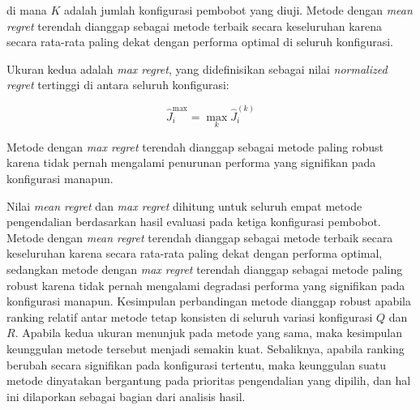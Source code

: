 \noindent di mana $K$ adalah jumlah konfigurasi pembobot yang diuji. Metode dengan \emph{mean regret} terendah dianggap sebagai metode terbaik secara keseluruhan karena secara rata-rata paling dekat dengan performa optimal di seluruh konfigurasi.

Ukuran kedua adalah \emph{max regret}, yang didefinisikan sebagai nilai \emph{normalized regret} tertinggi di antara seluruh konfigurasi:

\begin{equation}
    \hat{J}_i^{\max} = \max_{k} \hat{J}_i^{(k)}
    \label{eq:max-regret}
\end{equation}

\noindent Metode dengan \emph{max regret} terendah dianggap sebagai metode paling robust karena tidak pernah mengalami penurunan performa yang signifikan pada konfigurasi manapun.

Nilai \emph{mean regret} dan \emph{max regret} dihitung untuk seluruh empat metode pengendalian berdasarkan hasil evaluasi pada ketiga konfigurasi pembobot. Metode dengan \emph{mean regret} terendah dianggap sebagai metode terbaik secara keseluruhan karena secara rata-rata paling dekat dengan performa optimal, sedangkan metode dengan \emph{max regret} terendah dianggap sebagai metode paling robust karena tidak pernah mengalami degradasi performa yang signifikan pada konfigurasi manapun. Kesimpulan perbandingan metode dianggap robust apabila ranking relatif antar metode tetap konsisten di seluruh variasi konfigurasi $Q$ dan $R$. Apabila kedua ukuran menunjuk pada metode yang sama, maka kesimpulan keunggulan metode tersebut menjadi semakin kuat. Sebaliknya, apabila ranking berubah secara signifikan pada konfigurasi tertentu, maka keunggulan suatu metode dinyatakan bergantung pada prioritas pengendalian yang dipilih, dan hal ini dilaporkan sebagai bagian dari analisis hasil.
